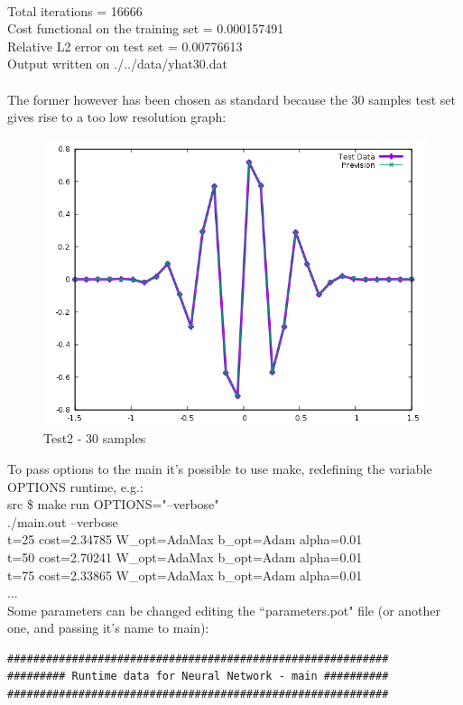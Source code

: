\documentclass[12pt, a4paper]{report}
\theoremstyle{definition}
\begin{document}
{{\\ \ttfamily 
	Total iterations = 16666\\
	Cost functional on the training set = 0.000157491\\
	Relative L2 error on test set = 0.00776613\\
	Output written on ./../data/yhat30.dat\\
\\}
The former however has been chosen as standard because the 30 samples test set gives rise to a too low resolution graph:
\begin{figure}[H]
	\centering
	\includegraphics[width=\textwidth]{img/Prevision1-30_nogrid} 
	\caption{Test2 - 30 samples}
\end{figure}
\noindent To pass options to the main it's possible to use make, redefining the variable {\ttfamily OPTIONS} runtime, e.g.:
{\\ \ttfamily 
src \$ make run OPTIONS="--verbose" \\
./main.out --verbose\\
t=25 cost=2.34785 W\_opt=AdaMax b\_opt=Adam alpha=0.01\\
t=50 cost=2.70241 W\_opt=AdaMax b\_opt=Adam alpha=0.01\\
t=75 cost=2.33865 W\_opt=AdaMax b\_opt=Adam alpha=0.01\\
...\\
}
Some parameters can be changed editing the ``parameters.pot" file (or another one, and passing it's name to main):
\begin{lstlisting}[frame=single,showstringspaces=false]
###########################################################
######### Runtime data for Neural Network - main ##########
###########################################################


\end{lstlisting}}
\end{document}
